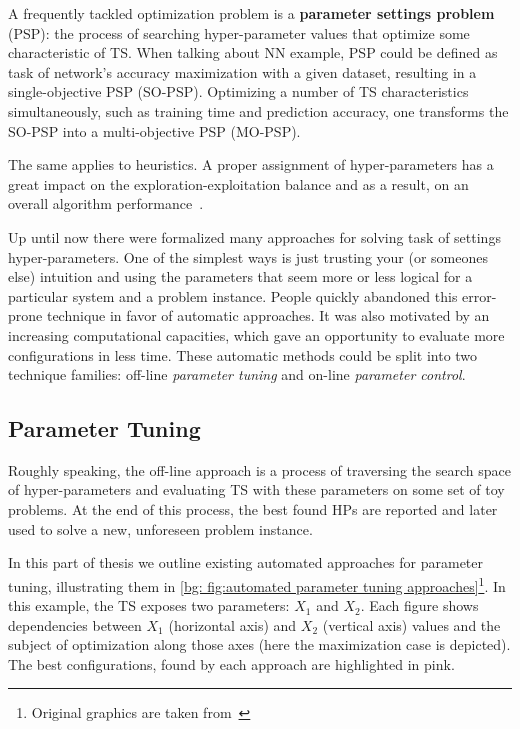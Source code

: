 A frequently tackled optimization problem is a \textbf{parameter settings problem} (PSP): the process of searching hyper-parameter values that optimize some characteristic of TS. When talking about NN example, PSP could be defined as task of network's accuracy maximization with a given dataset, resulting in a single-objective PSP (SO-PSP). Optimizing a number of TS characteristics simultaneously, such as training time and prediction accuracy, one transforms the SO-PSP into a multi-objective PSP (MO-PSP).

The same applies to heuristics. A proper assignment of hyper-parameters has a great impact on the exploration-exploitation balance and as a result, on an overall algorithm performance~\cite{lavesson2006quantifying}.

Up until now there were formalized many approaches for solving task of settings hyper-parameters. 
One of the simplest ways is just trusting your (or someones else) intuition and using the parameters that seem more or less logical for a particular system and a problem instance. People quickly abandoned this error-prone technique in favor of automatic approaches. It was also motivated by an increasing computational capacities, which gave an opportunity to evaluate more configurations in less time. These automatic methods could be split into two technique families: off-line \emph{parameter tuning} and on-line \emph{parameter control}.


\subsection{Parameter Tuning}\label{bg: parameter tuning}
Roughly speaking, the off-line approach is a process of traversing the search space of hyper-parameters and evaluating TS with these parameters on some set of toy problems. At the end of this process, the best found HPs are reported and later used to solve a new, unforeseen problem instance.

In this part of thesis we outline existing automated approaches for parameter tuning, illustrating them in \cref{bg: fig:automated parameter tuning approaches}\footnote{Original graphics are taken from~\cite{koch2017automated}}. In this example, the TS exposes two parameters: $X_1$ and $X_2$. Each figure shows dependencies between $X_1$ (horizontal axis) and $X_2$ (vertical axis) values and the subject of optimization along those axes (here the maximization case is depicted). The best configurations, found by each approach are highlighted in pink.

